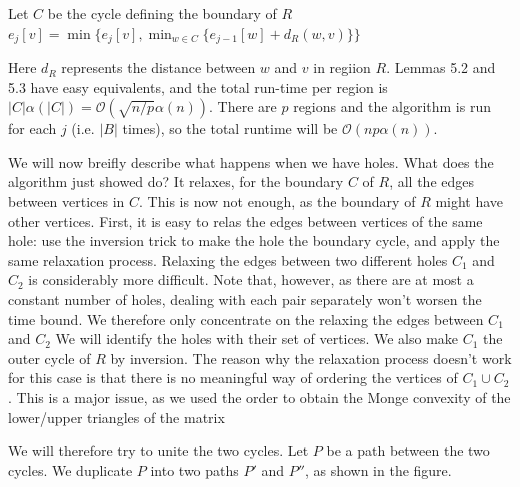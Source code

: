 \documentclass[11pt]{article}
\begin{document}
\begin{algorithm}[!htb]
  \label{multiple-regions}
  \begin{algorithmic}
      \State Let $C$ be the cycle defining the boundary of $R$
        \State $e_j[v] = \min\{e_j[v],\min_{w\in C}\{e_{j-1}[w]+d_R(w,v)\}\}$
      \EndFor
    \EndFor
  \end{algorithmic}
\end{algorithm}

Here $d_R$ represents the distance between $w$ and $v$ in regiion $R$. Lemmas 5.2 and 5.3 have easy equivalents, and the total run-time per region is $|C|\alpha(|C|) = \mathcal{O}(\sqrt{n/p}\alpha(n))$. There are $p$ regions and the algorithm is run for each $j$ (i.e. $|B|$ times), so the total runtime will be $\mathcal{O}(np\alpha(n))$.

We will now breifly describe what happens when we have holes. What does the algorithm just showed do? It relaxes, for the boundary $C$ of $R$, all the edges between vertices in $C$. This is now not enough, as the boundary of $R$ might have other vertices. First, it is easy to relas the edges between vertices of the same hole: use the inversion trick to make the hole the boundary cycle, and apply the same relaxation process. Relaxing the edges between two different holes $C_1$ and $C_2$ is considerably more difficult. Note that, however, as there are at most a constant number of holes, dealing with each pair separately won't worsen the time bound. We therefore only concentrate on the relaxing the edges between $C_1$ and $C_2$ We will identify the holes with their set of vertices. We also make $C_1$ the outer cycle of $R$ by inversion. The reason why the relaxation process doesn't work for this case is that there is no meaningful way of ordering the vertices of $C_1\cup C_2$. This is a major issue, as we used the order to obtain the Monge convexity of the lower/upper triangles of the matrix


We will therefore try to unite the two cycles. Let $P$ be a path between the two cycles. We duplicate $P$ into two paths $P'$ and $P''$, as shown in the figure.

\end{document}
